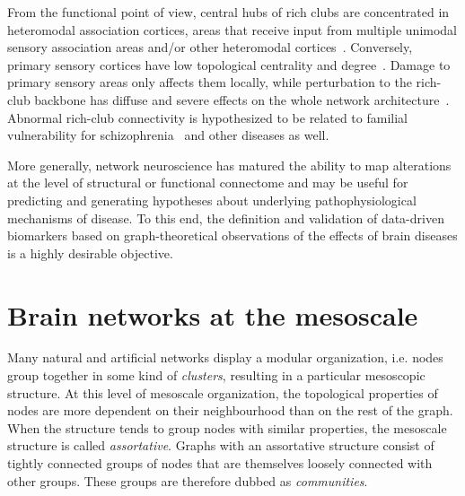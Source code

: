 From the functional point of view, central hubs of rich clubs are concentrated in heteromodal association cortices, areas that receive input from multiple unimodal sensory association areas and/or other heteromodal cortices~\cite{sporns2007,power2013,kandel2013}.
Conversely, primary sensory cortices have low topological centrality and degree~\cite{vandenheuvel2011,zamora-lopez2010,harriger2012}.
Damage to primary sensory areas only affects them locally, while perturbation to the rich-club backbone has diffuse and severe effects on the whole network architecture~\cite{honey2008,ball2014}.
Abnormal rich-club connectivity is hypothesized to be related to familial vulnerability for schizophrenia~\cite{collin2014impaired} and other diseases as well.

More generally, network neuroscience has matured the ability to map alterations at the level of structural or functional connectome and may be useful for predicting and generating hypotheses about underlying pathophysiological mechanisms of disease.
To this end, the definition and validation of data-driven biomarkers based on graph-theoretical observations of the effects of brain diseases is a highly desirable objective.

\section{Brain networks at the mesoscale}
Many natural and artificial networks display a modular organization, i.e. nodes group together in some kind of \emph{clusters}, resulting in a particular mesoscopic structure.
At this level of mesoscale organization, the topological properties of nodes are more dependent on their neighbourhood than on the rest of the graph.
When the structure tends to group nodes with similar properties, the mesoscale structure is called \emph{assortative}.
Graphs with an assortative structure consist of tightly connected groups of nodes that are themselves loosely connected with other groups.
These groups are therefore dubbed as \emph{communities}.

